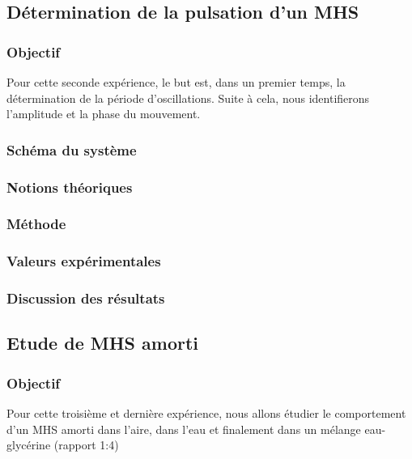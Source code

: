             
        \subsection{Détermination de la pulsation d'un MHS}
            \subsubsection{Objectif}
                Pour cette seconde expérience, le but est, dans un premier temps, la détermination de la période d'oscillations. 
                Suite à cela, nous identifierons l'amplitude et la phase du mouvement.
    
            \subsubsection{Schéma du système}
    
            \subsubsection{Notions théoriques}
    
            \subsubsection{Méthode}
    
            \subsubsection{Valeurs expérimentales}
                
            \subsubsection{Discussion des résultats}
    
        \subsection{Etude de MHS amorti}
            \subsubsection{Objectif}
                Pour cette troisième et dernière expérience, nous allons étudier le comportement d'un MHS amorti dans l'aire, dans l'eau et finalement dans un mélange eau-glycérine (rapport 1:4) 
    
